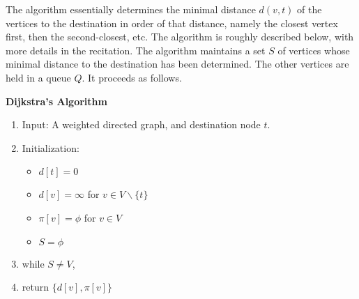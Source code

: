 The algorithm essentially determines the minimal distance $d(v,t)$ of the vertices to the destination in order of that distance, namely the closest vertex first, then the second-closest, etc.  The algorithm is roughly described below, with more details in the recitation.
The algorithm maintains a set $S$ of vertices whose minimal distance to the destination has been determined. The other vertices are held in a queue $Q$. It proceeds as follows.

\begin{algorithm_}\textbf{Dijkstra's Algorithm}
\begin{enumerate}
\item{Input:} A weighted directed graph, and destination node $t$.

\item Initialization:
\begin{itemize}
  \item[] $d[t] = 0$
  \item[] $d[v] = \infty $ for $v \in V\backslash \{ t\} $
  \item[] $\pi [v] = \phi $ for $v \in V$
  \item[] $S = \phi $
\end{itemize}

\item while $S \ne V$,




\item return $\{ d[v],\pi [v]\} $
\end{enumerate}
\end{algorithm_}

